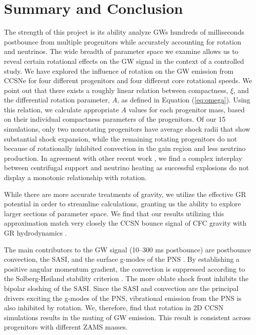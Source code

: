 \documentclass[twocolumn,times]{aastex62}  %
\begin{document}



\section{Summary and Conclusion}
\label{sec:summary}

The strength of this project is its ability analyze GWs hundreds of milliseconds postbounce from multiple progenitors while accurately accounting for rotation and neutrinos.  The wide breadth of parameter space we examine allows us to reveal certain rotational effects on the GW signal in the context of a controlled study.  We have explored the influence of rotation on the GW emission from CCSNe for four different progenitors and four different core rotational speeds.  
We point out that there exists a roughly linear relation between compactness, $\xi$, and the differential rotation parameter, $A$, as defined in Equation (\ref{eq:omega}). 
Using this relation, we calculate appropriate $A$ values for each progenitor mass, based on their individual compactness parameters of the \citet{Suk:2016} progenitors.  Of our 15 simulations, only two nonrotating progenitors have average shock radii that show substantial shock expansion, while the remaining rotating progenitors do not because of rotationally inhibited convection in the gain region and less neutrino production.  In agreement with other recent work \citep[e.g.,][]{summa:2018}, we find a complex interplay between centrifugal support and neutrino heating as successful explosions do not display a monotonic relationship with rotation.

While there are more accurate treatments of gravity, we utilize the effective GR potential in order to streamline calculations, granting us the ability to explore larger sections of parameter space. 
We find that our results utilizing this approximation match very closely the CCSN bounce signal of CFC gravity with GR hydrodynamics \citep{richers:2017}.  

The main contributors to the GW signal (10--300 ms postbounce) are postbounce convection, the SASI, and the surface g-modes of the PNS \citep{moro:2018}.  By establishing a positive angular momentum gradient, the convection is suppressed according to the Solberg-H{\o}iland stability criterion \citep{endal:1978,fryer:2000}.  The more oblate shock front inhibits the bipolar sloshing of the SASI.  Since the SASI and convection are the principal drivers exciting the g-modes of the PNS, vibrational emission from the PNS is also inhibited by rotation.  
We, therefore, find that rotation in 2D CCSN simulations results in the muting of GW emission.
This result is consistent across progenitors with different ZAMS masses. 
\end{document}
